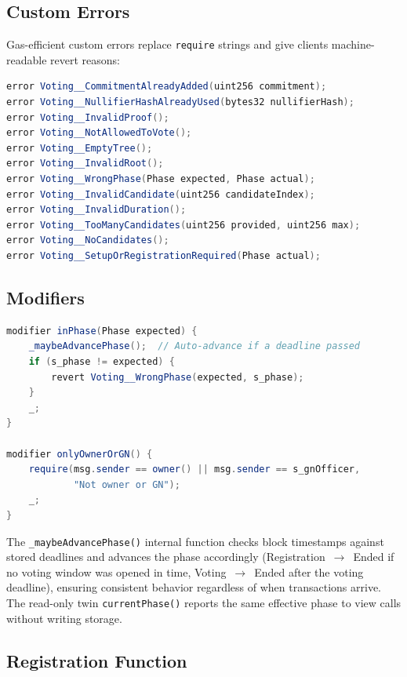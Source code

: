 \subsection{Custom Errors}

Gas-efficient custom errors replace \texttt{require} strings and give clients machine-readable revert reasons:

\begin{lstlisting}[language=Java, caption={Custom error declarations for precise revert reasons.}]
error Voting__CommitmentAlreadyAdded(uint256 commitment);
error Voting__NullifierHashAlreadyUsed(bytes32 nullifierHash);
error Voting__InvalidProof();
error Voting__NotAllowedToVote();
error Voting__EmptyTree();
error Voting__InvalidRoot();
error Voting__WrongPhase(Phase expected, Phase actual);
error Voting__InvalidCandidate(uint256 candidateIndex);
error Voting__InvalidDuration();
error Voting__TooManyCandidates(uint256 provided, uint256 max);
error Voting__NoCandidates();
error Voting__SetupOrRegistrationRequired(Phase actual);
\end{lstlisting}

\subsection{Modifiers}

\begin{lstlisting}[language=Java, caption={Phase enforcement and access control modifiers.}]
modifier inPhase(Phase expected) {
    _maybeAdvancePhase();  // Auto-advance if a deadline passed
    if (s_phase != expected) {
        revert Voting__WrongPhase(expected, s_phase);
    }
    _;
}

modifier onlyOwnerOrGN() {
    require(msg.sender == owner() || msg.sender == s_gnOfficer,
            "Not owner or GN");
    _;
}
\end{lstlisting}

The \texttt{\_maybeAdvancePhase()} internal function checks block timestamps against stored deadlines and advances the phase accordingly (Registration~$\to$~Ended if no voting window was opened in time, Voting~$\to$~Ended after the voting deadline), ensuring consistent behavior regardless of when transactions arrive. The read-only twin \texttt{currentPhase()} reports the same effective phase to view calls without writing storage.

\subsection{Registration Function}

